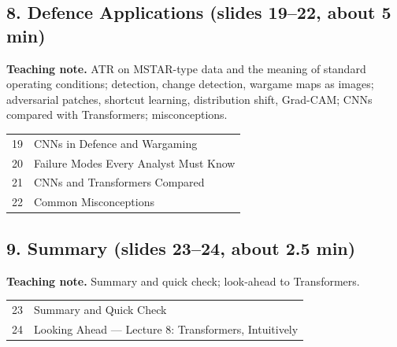 \documentclass[11pt]{article}
\begin{document}
\subsection{8. Defence Applications \normalfont\small\color{GreyN}(slides 19--22, about 5 min)}

\textbf{Teaching note.} ATR on MSTAR-type data and the meaning of standard operating conditions; detection, change detection, wargame maps as images; adversarial patches, shortcut learning, distribution shift, Grad-CAM; CNNs compared with Transformers; misconceptions.

\begin{center}\small\renewcommand{\arraystretch}{1.1}\begin{tabularx}{\textwidth}{@{}r X@{}}19 & CNNs in Defence and Wargaming\\
20 & Failure Modes Every Analyst Must Know\\
21 & CNNs and Transformers Compared\\
22 & Common Misconceptions\\\end{tabularx}\end{center}

\subsection{9. Summary \normalfont\small\color{GreyN}(slides 23--24, about 2.5 min)}

\textbf{Teaching note.} Summary and quick check; look-ahead to Transformers.

\begin{center}\small\renewcommand{\arraystretch}{1.1}\begin{tabularx}{\textwidth}{@{}r X@{}}23 & Summary and Quick Check\\
24 & Looking Ahead --- Lecture 8: Transformers, Intuitively\\\end{tabularx}\end{center}
\end{document}

